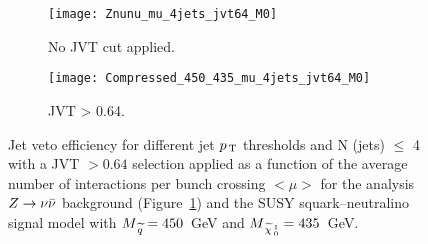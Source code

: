 \begin{figure}[!h]
  \centering
  \begin{subfigure}[t]{.48\linewidth}
    \texttt{[image: Znunu\_mu\_4jets\_jvt64\_M0]}
    \caption{No JVT cut applied.}
    \label{fig:znunu_4jets_jvt64}
  \end{subfigure}
  \begin{subfigure}[t]{.48\linewidth}
    \texttt{[image: Compressed\_450\_435\_mu\_4jets\_jvt64\_M0]}
    \caption{JVT > 0.64.}
    \label{fig:comp_4jets_jvt64_1}
  \end{subfigure}
  \caption{Jet veto efficiency for different jet $p_\mathrm{\, T}$ thresholds and N (jets)
    $\leq$ 4 with a JVT $> 0.64$ selection applied as a function of the average
    number of interactions per bunch crossing $<\mu>$ for the analysis $Z \rightarrow \nu \bar{\nu}$
    background (Figure~\ref{fig:znunu_4jets_jvt64}) and the SUSY
    squark--neutralino signal model with $M_{\, \widetilde{q}} = 450$~GeV and $M_{\, \widetilde{\chi}_{\, 0}^{\, 1}}
    = 435$~GeV.}
  \label{fig:jet_veto_comparison}
\end{figure}
